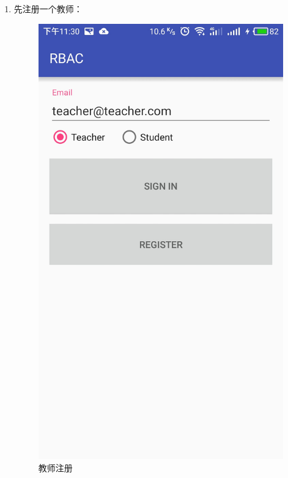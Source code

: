 \begin{itemize}
\begin{enumerate}
\begin{itemize}
\begin{enumerate}
				\item 先注册一个教师：
				\begin{figure}[H]
					\centering
					\includegraphics[height=0.39\textheight]{snapshot/3}
					\caption{教师注册}
					\label{fig:3}
				\end{figure}
				

\end{enumerate}
\end{itemize}
\end{enumerate}
\end{itemize}
